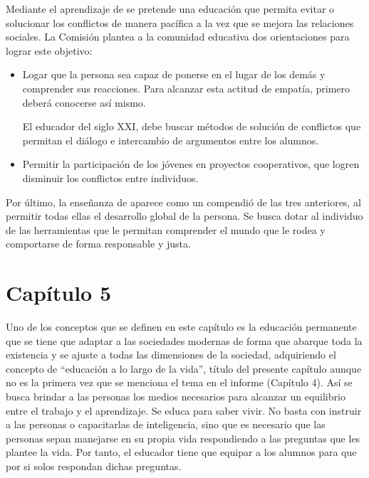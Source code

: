 Mediante el aprendizaje de  se pretende una educación que permita evitar o solucionar los conflictos de manera pacífica a la vez que se mejora las relaciones sociales. La Comisión plantea a la comunidad educativa dos orientaciones para lograr este objetivo:

\begin{itemize}
\item Logar que la persona sea capaz de ponerse en el lugar de los demás y comprender sus reacciones. Para alcanzar esta actitud de empatía, primero deberá conocerse así mismo. 

\subitem El educador del siglo XXI, debe buscar métodos de solución de conflictos que permitan el diálogo e intercambio de argumentos entre los alumnos.

\item Permitir la participación de los jóvenes en proyectos cooperativos, que logren disminuir los conflictos entre individuos.
\end{itemize}

Por último, la enseñanza de  aparece como un compendió de las tres anteriores, al permitir todas ellas el desarrollo global de la persona. Se busca dotar al individuo de las herramientas que le permitan comprender el mundo que le rodea y comportarse de forma responsable y justa.


\section*{Capítulo 5}

Uno de los conceptos que se definen en este capítulo es la educación permanente que se tiene que adaptar a las sociedades modernas de forma que abarque toda la existencia y se ajuste a todas las dimensiones de la sociedad, adquiriendo el concepto de “educación a lo largo de la vida”, título del presente capítulo aunque no es la primera vez que se menciona el tema en el informe (Capítulo 4).
%
Así se busca brindar a las personas los medios necesarios para alcanzar un equilibrio entre el trabajo y el aprendizaje.
%
Se educa para saber vivir.
%
No basta con instruir a las personas o capacitarlas de inteligencia, sino que es necesario que las personas sepan manejarse en su propia vida respondiendo a las preguntas que les plantee la vida.
%
Por tanto, el educador tiene que equipar a los alumnos para que por si solos respondan dichas preguntas.
%

